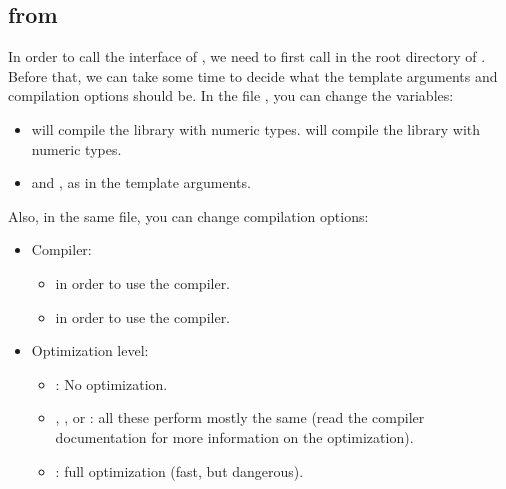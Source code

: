 \documentclass[10pt,utf8,compress,xcolor=dvipsnames]{beamer}
\begin{document}
\subsection{\mimes from \PY}
\begin{frame}[fragile]{\insertsubsectionhead}
	In order to call the \PY interface of \mimes, we need to first call  in the root directory of \mimes.\\[0.2cm]
	
	Before that, we can take some time to decide what the template arguments and compilation  options should be. In the 
	file , you can change the variables:
	\begin{itemize}
		\item {} will compile the library with  numeric types.  will compile the library with  numeric types.
		\item {} and , as in the template arguments.
	\end{itemize}
	
	Also, in the same file, you can change compilation options:
	\begin{itemize}
		\item Compiler:
		\begin{itemize}
			\item {} in order to use the  \CPP compiler.
			\item {} in order to use the  \CPP compiler.
		\end{itemize}
		\item Optimization level:
		\begin{itemize}
			\item {}: No optimization. 
			\item {}, , or : all these perform mostly the same (read the compiler documentation for more information on the optimization).
			\item {}: full optimization (fast, but dangerous). 
		\end{itemize}
	\end{itemize}
\end{frame}
\end{document}
